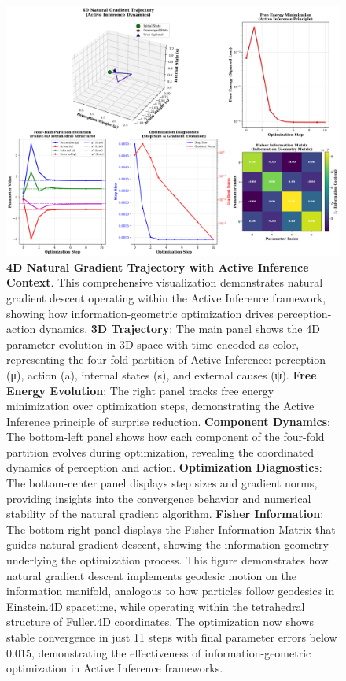 \documentclass[
  10pt,
]{article}
\begin{document}
\begin{figure}
\centering
\includegraphics{../output/figures/figure_13_4d_trajectory.png}
\caption{\textbf{4D Natural Gradient Trajectory with Active Inference
Context}. This comprehensive visualization demonstrates natural gradient
descent operating within the Active Inference framework, showing how
information-geometric optimization drives perception-action dynamics.
\textbf{3D Trajectory}: The main panel shows the 4D parameter evolution
in 3D space with time encoded as color, representing the four-fold
partition of Active Inference: perception (μ), action (a), internal
states (s), and external causes (ψ). \textbf{Free Energy Evolution}: The
right panel tracks free energy minimization over optimization steps,
demonstrating the Active Inference principle of surprise reduction.
\textbf{Component Dynamics}: The bottom-left panel shows how each
component of the four-fold partition evolves during optimization,
revealing the coordinated dynamics of perception and action.
\textbf{Optimization Diagnostics}: The bottom-center panel displays step
sizes and gradient norms, providing insights into the convergence
behavior and numerical stability of the natural gradient algorithm.
\textbf{Fisher Information}: The bottom-right panel displays the Fisher
Information Matrix that guides natural gradient descent, showing the
information geometry underlying the optimization process. This figure
demonstrates how natural gradient descent implements geodesic motion on
the information manifold, analogous to how particles follow geodesics in
Einstein.4D spacetime, while operating within the tetrahedral structure
of Fuller.4D coordinates. The optimization now shows stable convergence
in just 11 steps with final parameter errors below 0.015, demonstrating
the effectiveness of information-geometric optimization in Active
Inference frameworks.}
\end{figure}
\end{document}
